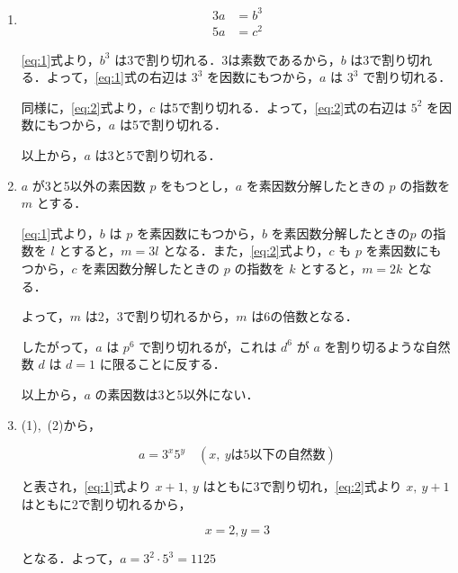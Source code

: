 \documentclass[a4paper]{ltjsarticle}
\begin{document}
\begin{enumerate}[label=(\arabic*)]
    \item
          \begin{align}
              3a & =b^3\label{eq:1} \\
              5a & =c^2\label{eq:2}
          \end{align}

          \eqref{eq:1}式より，$b^3$ は3で割り切れる．3は素数であるから，$b$ は3で割り切れる．よって，\eqref{eq:1}式の右辺は $3^3$ を因数にもつから，$a$ は $3^3$ で割り切れる．

          同様に，\eqref{eq:2}式より，$c$ は5で割り切れる．よって，\eqref{eq:2}式の右辺は $5^2$ を因数にもつから，$a$ は5で割り切れる．

          以上から，$a$ は3と5で割り切れる．

    \item $a$ が3と5以外の素因数 $p$ をもつとし，$a$ を素因数分解したときの $p$ の指数を $m$ とする．

          \eqref{eq:1}式より，$b$ は $p$ を素因数にもつから，$b$ を素因数分解したときの$p$ の指数を $l$ とすると，$m=3l$ となる．また，\eqref{eq:2}式より，$c$ も $p$ を素因数にもつから，$c$ を素因数分解したときの $p$ の指数を $k$ とすると，$m=2k$ となる．

          よって，$m$ は2，3で割り切れるから，$m$ は6の倍数となる．

          したがって，$a$ は $p^6$ で割り切れるが，これは $d^6$ が $a$ を割り切るような自然数 $d$ は $d=1$ に限ることに反する．

          以上から，$a$ の素因数は3と5以外にない．

    \item (1),\ (2)から，

          \begin{equation*}
              a=3^{x}5^{y}\quad (x,\ y\text{は5以下の自然数})
          \end{equation*}

          と表され，\eqref{eq:1}式より $x+1,\ y$ はともに3で割り切れ，\eqref{eq:2}式より $x,\ y+1$ はともに2で割り切れるから，

          \begin{equation*}
              x=2, y=3
          \end{equation*}

          となる．よって，$a=3^2\cdot 5^3=1125$
\end{enumerate}

\end{document}

